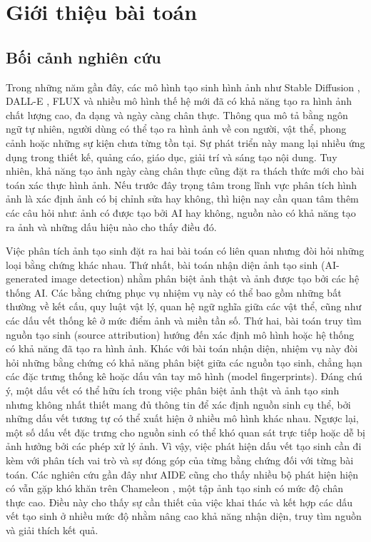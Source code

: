 \documentclass[12pt]{report}
\begin{document}
\firstbeforepreface 
\setcounter{page}{1} 
\newpage 
\afterpreface 

\section{Giới thiệu bài toán}
\label{sec:intro}

\subsection{Bối cảnh nghiên cứu}
Trong những năm gần đây, các mô hình tạo sinh hình ảnh như Stable Diffusion \cite{rombach2022high}, DALL-E \cite{betker2023improving}, FLUX \cite{labs2025flux1kontextflowmatching} và nhiều mô hình thế hệ mới đã có khả năng tạo ra hình ảnh chất lượng cao, đa dạng và ngày càng chân thực. Thông qua mô tả bằng ngôn ngữ tự nhiên, người dùng có thể tạo ra hình ảnh về con người, vật thể, phong cảnh hoặc những sự kiện chưa từng tồn tại. Sự phát triển này mang lại nhiều ứng dụng trong thiết kế, quảng cáo, giáo dục, giải trí và sáng tạo nội dung. Tuy nhiên, khả năng tạo ảnh ngày càng chân thực cũng đặt ra thách thức mới cho bài toán xác thực hình ảnh. Nếu trước đây trọng tâm trong lĩnh vực phân tích hình ảnh là xác định ảnh có bị chỉnh sửa hay không, thì hiện nay cần quan tâm thêm các câu hỏi như: ảnh có được tạo bởi AI hay không, nguồn nào có khả năng tạo ra ảnh và những dấu hiệu nào cho thấy điều đó.

Việc phân tích ảnh tạo sinh đặt ra hai bài toán có liên quan nhưng đòi hỏi những loại bằng chứng khác nhau. Thứ nhất, bài toán nhận diện ảnh tạo sinh (AI-generated image detection) nhằm phân biệt ảnh thật và ảnh được tạo bởi các hệ thống AI. Các bằng chứng phục vụ nhiệm vụ này có thể bao gồm những bất thường về kết cấu, quy luật vật lý, quan hệ ngữ nghĩa giữa các vật thể, cũng như các dấu vết thống kê ở mức điểm ảnh và miền tần số. Thứ hai, bài toán truy tìm nguồn tạo sinh (source attribution) hướng đến xác định mô hình hoặc hệ thống có khả năng đã tạo ra hình ảnh. Khác với bài toán nhận diện, nhiệm vụ này đòi hỏi những bằng chứng có khả năng phân biệt giữa các nguồn tạo sinh, chẳng hạn các đặc trưng thống kê hoặc dấu vân tay mô hình (model fingerprints). Đáng chú ý, một dấu vết có thể hữu ích trong việc phân biệt ảnh thật và ảnh tạo sinh nhưng không nhất thiết mang đủ thông tin để xác định nguồn sinh cụ thể, bởi những dấu vết tương tự có thể xuất hiện ở nhiều mô hình khác nhau. Ngược lại, một số dấu vết đặc trưng cho nguồn sinh có thể khó quan sát trực tiếp hoặc dễ bị ảnh hưởng bởi các phép xử lý ảnh. Vì vậy, việc phát hiện dấu vết tạo sinh cần đi kèm với phân tích vai trò và sự đóng góp của từng bằng chứng đối với từng bài toán. Các nghiên cứu gần đây như AIDE \cite{yan2025sanity} cũng cho thấy nhiều bộ phát hiện hiện có vẫn gặp khó khăn trên Chameleon \cite{yan2025sanity}, một tập ảnh tạo sinh có mức độ chân thực cao. Điều này cho thấy sự cần thiết của việc khai thác và kết hợp các dấu vết tạo sinh ở nhiều mức độ nhằm nâng cao khả năng nhận diện, truy tìm nguồn và giải thích kết quả.
\end{document}
